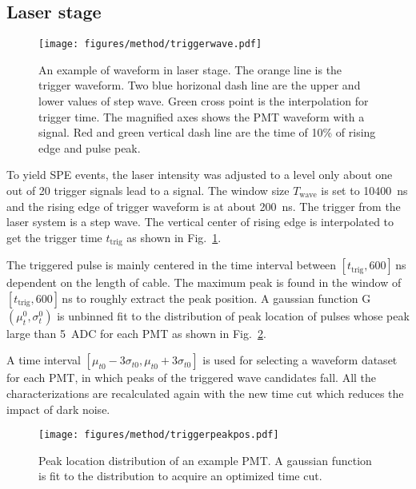 \subsection{Laser stage}
\label{sec:laserstage}

\begin{figure}[!htbp]
    \centering
    \texttt{[image: figures/method/triggerwave.pdf]}
    \caption{An example of waveform in laser stage. The orange line is the trigger waveform. Two blue horizonal dash line are the upper and lower values of step wave. Green cross point is the interpolation for trigger time. The magnified axes shows the PMT waveform with a signal. Red and green vertical dash line are the time of 10\% of rising edge and pulse peak.}
    \label{fig:triggertime}
\end{figure}

To yield SPE events, the laser intensity was adjusted to a level only about one out of 20 trigger signals lead to a signal. The window size $T_{\mathrm{wave}}$ is set to \SI{10400}{ns} and the rising edge of trigger waveform is at about \SI{200}{ns}. The trigger from the laser system is a step wave. The vertical center of rising edge is interpolated to get the trigger time $t_{\mathrm{trig}}$ as shown in Fig.~\ref{fig:triggertime}.

The triggered pulse is mainly centered in the time interval between $[t_{\mathrm{trig}}, 600]$\,ns dependent on the length of cable. The maximum peak is found in the window of $[t_{\mathrm{trig}}, 600]$\,ns to roughly extract the peak position. A gaussian function G$(\mu_t^0,\sigma_t^0)$ is unbinned fit to the distribution of peak location of pulses whose peak large than \SI{5}{ADC} for each PMT as shown in Fig.~\ref{fig:peaklocation}.

A time interval $[\mu_{t0}-3\sigma_{t0}, \mu_{t0}+3\sigma_{t0}]$ is used for selecting a waveform dataset for each PMT, in which peaks of the triggered wave candidates fall. All the characterizations are recalculated again with the new time cut which reduces the impact of dark noise.

\begin{figure}[!htbp]
    \centering
    \texttt{[image: figures/method/triggerpeakpos.pdf]}
    \caption{Peak location distribution of an example PMT. A gaussian function is fit to the distribution to acquire an optimized time cut.}%
    \label{fig:peaklocation}
\end{figure}

